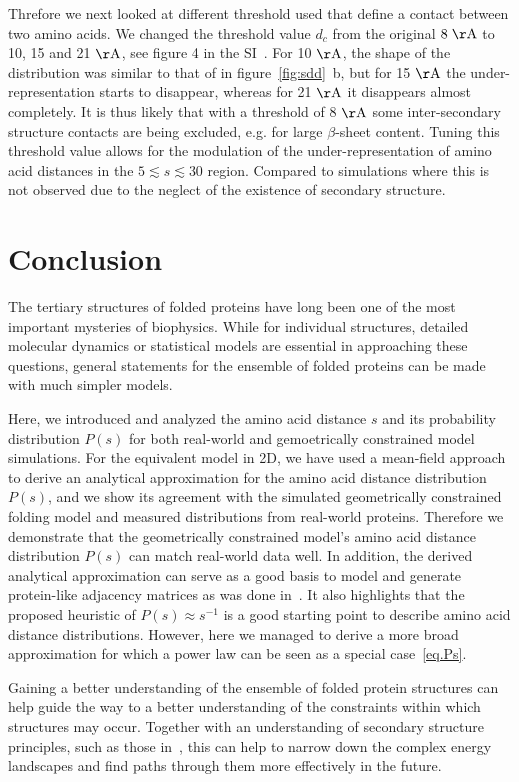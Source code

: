 \documentclass[10pt]{iopart}
\begin{document}
Threfore we next looked at different threshold used that define a contact between two amino acids. We changed the threshold value $d_c$ from the original $8 \; \mathrm{\AA}$ to 10, 15 and 21 $\mathrm{\AA}$, see figure 4 in the SI~\cite{SI}. For 10 $\mathrm{\AA}$, the shape of the distribution was similar to that of in figure~\ref{fig:sdd}~b, but for 15 $\mathrm{\AA}$ the under-representation starts to disappear, whereas for 21 $\mathrm{\AA}$ it disappears almost completely. It is thus likely that with a threshold of 8 $\mathrm{\AA}$ some inter-secondary structure contacts are being excluded, e.g. for large $\beta$-sheet content. Tuning this threshold value allows for the modulation of the under-representation of amino acid distances in the $5 \lesssim s \lesssim 30$ region. Compared to simulations where this is not observed due to the neglect of the existence of secondary structure.

\section{Conclusion}
The tertiary structures of folded proteins have long been one of the most important mysteries of biophysics. While for individual structures, detailed molecular dynamics or statistical models are essential in approaching these questions, general statements for the ensemble of folded proteins can be made with much simpler models.

Here, we introduced and analyzed the amino acid distance $s$ and its probability distribution $P(s)$ for both real-world and gemoetrically constrained model simulations. For the equivalent model in 2D, we have used a mean-field approach to derive an analytical approximation for the amino acid distance distribution $P(s)$, and we show its agreement with the simulated geometrically constrained folding model and measured distributions from real-world proteins.
Therefore we demonstrate that the geometrically constrained model's amino acid distance distribution $P(s)$ can match real-world data well. In addition, the derived analytical approximation can serve as a good basis to model and generate protein-like adjacency matrices as was done in~\cite{bartoli2008effecta}. It also highlights that the proposed heuristic of $P(s)\approx s^{-1}$ is a good starting point to describe amino acid distance distributions. However, here we managed to derive a more broad approximation for which a power law can be seen as a special case~\ref{eq.Ps}.

Gaining a better understanding of the ensemble of folded protein structures can help guide the way to a better understanding of the constraints within which structures may occur. Together with an understanding of secondary structure principles, such as those in~\cite{Danielsson2010, Molkenthin2011}, this can help to narrow down the complex energy landscapes and find paths through them more effectively in the future.
\end{document}
